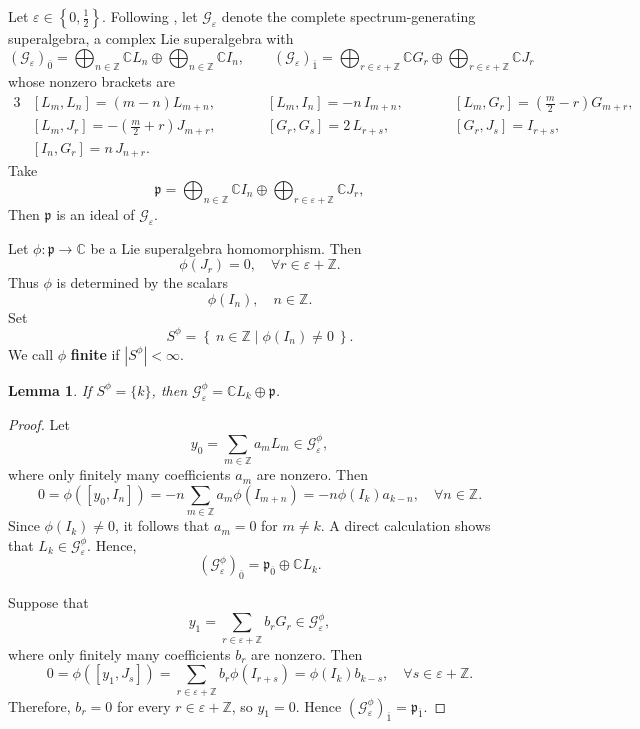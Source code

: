 \documentclass[12pt,reqno]{article}
\newtheorem{lem}[thm]{Lemma}
\def\o{\overline}
\def\ve{\varepsilon}
\def\F{\mathfrak}
\def\C{\mathcal}
\def\CC{\mathbb{C}}
\def\ZZ{\mathbb{Z}}
\def\beqn{\begin{equation*}}
\def\eeqn{\end{equation*}}
\begin{document}
Let $\ve\in\left\{0,\frac{1}{2}\right\}$. Following \cite{GMP}, let $\C{G}_\ve$ denote the complete spectrum-generating superalgebra, a complex Lie superalgebra with
\beqn
(\C{G}_\varepsilon)_{\overline{0}} = \bigoplus_{n\in\mathbb{Z}} \mathbb{C}L_n \oplus \bigoplus_{n\in\mathbb{Z}} \mathbb{C}I_n,\qquad
(\C{G}_\varepsilon)_{\overline{1}} = \bigoplus_{r\in \varepsilon+\mathbb{Z}} \mathbb{C}G_r \oplus \bigoplus_{r\in \varepsilon+\mathbb{Z}} \mathbb{C}J_r
\eeqn
whose nonzero brackets are
\begin{alignat*}{3}
&[L_m, L_n] = (m-n)L_{m+n},
&\qquad &[L_m, I_n] = -n\,I_{m+n},
&\qquad &[L_m, G_r] = \left(\frac{m}{2}-r\right)G_{m+r},
\\
&[L_m, J_r] = -\left(\frac{m}{2}+r\right)J_{m+r},
&\qquad &[G_r, G_s] = 2\,L_{r+s},
&\qquad &[G_r, J_s] = I_{r+s},
\\
&[I_n, G_r] = n\,J_{n+r}.
\end{alignat*}
Take 
\beqn
\F{p} = \bigoplus_{n\in\mathbb{Z}} \mathbb{C}I_n \oplus \bigoplus_{r\in \varepsilon+\mathbb{Z}} \mathbb{C}J_r,
\eeqn
Then $\F{p}$ is an ideal of $\C{G}_\ve$.

Let $\phi\colon\F{p}\rightarrow\CC$ be a Lie superalgebra homomorphism. Then
\beqn
\phi(J_r) = 0, \quad \forall r\in \ve+\ZZ.
\eeqn
Thus $\phi$ is determined by the scalars
\beqn
\phi(I_n),\quad n\in\mathbb{Z}.
\eeqn
Set
\beqn
S^{\phi} = \left\{~n \in \mathbb{Z}\middle|\phi(I_{n})\neq 0~\right\}.
\eeqn
We call $\phi$ {\bf finite} if $|S^{\phi}|<\infty$.



\begin{lem}
If $S^\phi=\{k\}$, then $\C{G}_\ve^\phi=\CC L_k\oplus\F{p}$.
\end{lem}

\begin{proof}
Let
\beqn
y_0=\sum_{m\in\ZZ}a_mL_m\in \C{G}_\ve^\phi,
\eeqn
where only finitely many coefficients $a_m$ are nonzero. Then
\beqn
0=\phi([y_0,I_n])=-n\sum_{m\in\ZZ}a_m\phi(I_{m+n})
=-n\phi(I_k)a_{k-n},\quad \forall n\in\ZZ.
\eeqn
Since $\phi(I_k)\neq0$, it follows that $a_m=0$ for $m\neq k$. A direct calculation shows that $L_k\in\C{G}_\ve^\phi$. Hence,
\beqn
(\C{G}^\phi_\ve)_{\o{0}}=\F{p}_{\o{0}}\oplus\CC L_k.
\eeqn	

Suppose that 
\beqn
y_1=\sum_{r\in \ve+\ZZ} b_r G_r\in \C{G}_\ve^\phi,
\eeqn
where only finitely many coefficients $b_r$ are nonzero. Then
\beqn
0=\phi([y_1,J_s])=\sum_{r\in\ve+\ZZ}b_r\phi(I_{r+s})
=\phi(I_k)b_{k-s},\quad\forall s\in\ve+\ZZ.
\eeqn
Therefore, $b_r=0$ for every $r\in\ve+\ZZ$, so $y_1=0$. Hence $(\C{G}^\phi_\ve)_{\o{1}}=\F{p}_{\o{1}}$.
\end{proof}
\end{document}

